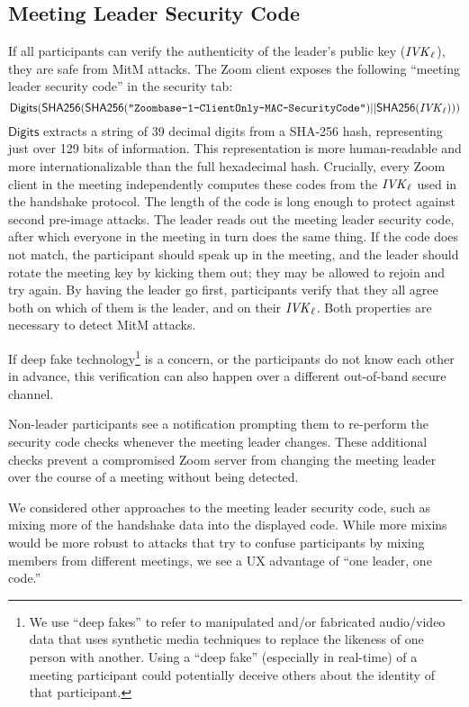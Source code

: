 \subsection{Meeting Leader Security Code}\label{subsec:securitycode} If all participants can verify
the authenticity of the leader's public key ($\mathit{IVK}_{\ell}$), they are safe from MitM attacks. The
Zoom client exposes the following ``meeting leader security code'' in the security tab:
$$\mathsf{Digits}({\sf SHA256}({\sf SHA256}(\texttt{"Zoombase-1-ClientOnly-MAC-SecurityCode"}) ||
{\sf SHA256}(\mathit{IVK}_{\ell})))$$
$\mathsf{Digits}$ extracts a string of 39 decimal digits from a SHA-256 hash, representing just over
129 bits of information. This representation is more human-readable and more internationalizable
than the full hexadecimal hash. Crucially, every Zoom client in the meeting independently computes
these codes from the $\mathit{IVK}_{\ell}$ used in the handshake protocol. The length of the code is long
enough to protect against second pre-image attacks. The leader reads out the meeting leader security
code, after which everyone in the meeting in turn does the same thing. If the code does not match,
the participant should speak up in the meeting, and the leader should rotate the meeting key by
kicking them out; they may be allowed to rejoin and try again. By having the leader go first,
participants verify that they all agree both on which of them is the leader, and on their
$\mathit{IVK}_{\ell}$. Both properties are necessary to detect MitM attacks.

If deep fake technology\footnote{We use ``deep fakes'' to refer to manipulated and/or fabricated
audio/video data that uses synthetic media techniques to replace the likeness of one person with
another. Using a ``deep fake'' (especially in real-time) of a meeting participant could potentially
deceive others about the identity of that participant.} is a concern, or the participants do not
know each other in advance, this verification can also happen over a different out-of-band secure
channel.

Non-leader participants see a notification prompting them to re-perform the security code checks
whenever the meeting leader changes. These additional checks prevent a compromised Zoom server from
changing the meeting leader over the course of a meeting without being detected.

We considered other approaches to the meeting leader security code, such as mixing more of the
handshake data into the displayed code. While more mixins would be more robust to attacks that try
to confuse participants by mixing members from different meetings, we see a UX advantage of ``one
leader, one code.''

